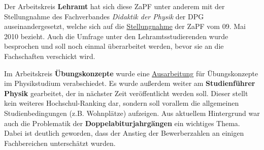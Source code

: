 \documentclass{scrartcl}
\begin{document}
Der Arbeitskreis \textbf{Lehramt} hat sich diese ZaPF unter anderem mit der Stellungnahme des Fachverbandes
\textit{Didaktik der Physik} der DPG auseinandergesetzt, welche sich auf die
\href{http://zapfev.de/sites/default/files/Lehramtstellungnahme.pdf}{Stellungnahme} der ZaPF vom 09. Mai 2010 bezieht.
Auch die Umfrage unter den Lehramtsstudierenden wurde besprochen und soll noch einmal überarbeitet werden,
bevor sie an die Fachschaften verschickt wird.

Im Arbeitskreis \textbf{Übungskonzepte} wurde eine
\href{http://zapfev.de/sites/default/files/2011_05_Ausarbeitung_\%C3\%9Cbungskonzepte.pdf}{Ausarbeitung} für
Übungskonzepte im Physikstudium verabschiedet. Es wurde außerdem weiter am \textbf{Studienführer Physik} gearbeitet,
der in nächster Zeit veröffentlicht werden soll. Dieser stellt kein weiteres Hochschul-Ranking dar, sondern soll
vorallem die allgemeinen Studienbedingungen (z.B. Wohnplätze) aufzeigen. Aus aktuellem Hintergrund war auch die
Problematik der \textbf{Doppelabiturjahrgängen} ein wichtiges Thema. Dabei ist deutlich geworden, dass der Anstieg der
Bewerberzahlen an einigen Fachbereichen unterschätzt wurden.
 
\end{document}
